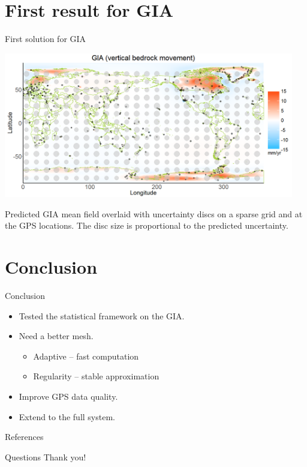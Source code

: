 \documentclass{beamer}
\begin{document}
\section{First result for GIA}
\begin{frame}{First solution for GIA}
\vspace{0.2cm}
\begin{center}
\includegraphics[width = 0.95\textwidth]{images/GIA_map}
\end{center}
\footnotesize{Predicted GIA mean field overlaid with uncertainty discs on a sparse grid and at the GPS locations. The disc size is proportional to the predicted uncertainty.}
\end{frame}

\section{Conclusion}
\begin{frame}{Conclusion}

\begin{itemize}
\item Tested the statistical framework on the GIA.
\item Need a better mesh.
\begin{itemize}
\item Adaptive -- fast computation
\item Regularity -- stable approximation
\end{itemize}
\item Improve GPS data quality.
\item Extend to the full system.
\end{itemize}


\end{frame}

\begin{frame}{References}

\small{}
\end{frame}


\begin{frame}{Questions}
\centering
\Huge
Thank you!
\end{frame}
\end{document}
